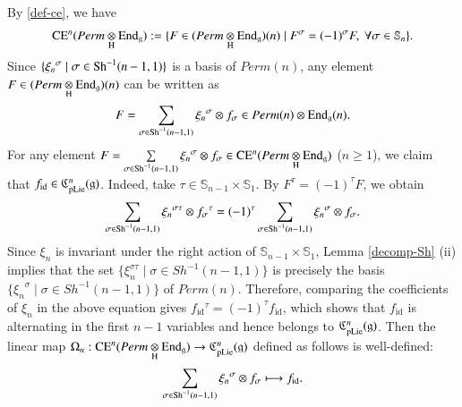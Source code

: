 \documentclass[12pt]{amsart}
\theoremstyle{definition}
\newcommand{\g}{\mathfrak g}
\newcommand{\frkC}{\mathfrak C}
\newcommand{\id}{\mathrm{id}}
\newcommand{\End}{\mathrm{End}}
\newcommand{\ot}{\otimes}
\newcommand{\s}{\mathbb{S}}
\newcommand{\Sh}{{\rm Sh}}
\newcommand{\ce}{{\rm CE}}
\newcommand{\pl}{{\rm pLie}}
\begin{document}
 

By \eqref{def-ce}, we have
\[
\ce^n(Perm\underset{{\rm H}}{\ot}\End_\g):=\{F\in (Perm\underset{{\rm H}}{\ot}\End_\g)(n)\mid F^\sigma=(-1)^\sigma F,\ \forall \sigma\in\s_n\}.
\]
Since $\{{\xi_n}^\sigma \mid \sigma\in\Sh^{-1}(n-1,1)\}$ is a basis of $Perm(n)$, any element $F\in (Perm\underset{{\rm H}}{\ot}\End_\g)(n)$ can be written as
\begin{align*}
	F=\sum_{\sigma\in\Sh^{-1}(n-1,1)} {\xi_n}^\sigma \ot f_\sigma\in Perm(n)\ot \End_\g(n).
\end{align*}
For any element $F=\sum\limits_{\sigma\in\Sh^{-1}(n-1,1)}{\xi_n}^\sigma\otimes f_\sigma \in \ce^n(Perm\underset{{\rm H}}{\ot}\End_\g)$ ($n\geq 1$), we claim that $f_\id\in \frkC_{\pl}^n(\g)$. Indeed, take $\tau\in\s_{n-1}\times\s_1$. By $F^\tau=(-1)^\tau F$, we obtain
\[
\sum_{\sigma\in\Sh^{-1}(n-1,1)} {\xi_n}^{\sigma\tau}\ot f_\sigma{}^\tau = (-1)^\tau\sum_{\sigma\in\Sh^{-1}(n-1,1)} {\xi_n}^\sigma\ot f_\sigma .
\]
Since $\xi_{n}$ is invariant under the right action of $\s_{n-1}\times\s_1$, Lemma \ref{decomp-Sh} {\rm (ii)} implies that  the set $\{\xi^{\sigma\tau}_n\mid \sigma\in Sh^{-1}(n-1,1)\}$ is precisely the basis $\{{\xi_n}^{\sigma}\mid\sigma\in Sh^{-1}(n-1,1)\}$ of $Perm(n)$.   Therefore, comparing the coefficients of $\xi_n$ in the above equation gives $f_\id{}^\tau=(-1)^\tau f_\id$, which shows that $f_\id$ is alternating in the first $n-1$ variables and hence belongs to $\frkC_{\pl}^n(\g)$. Then the linear map $\Omega_n:\ce^n(Perm\underset{{\rm H}}{\ot}\End_\g)\to \frkC_{\pl}^n(\g)$ defined as follows is well-defined:
\begin{align}
\sum_{\sigma\in\Sh^{-1}(n-1,1)} {\xi_n}^\sigma\ot f_\sigma \longmapsto f_\id.
\end{align}
\end{document}
